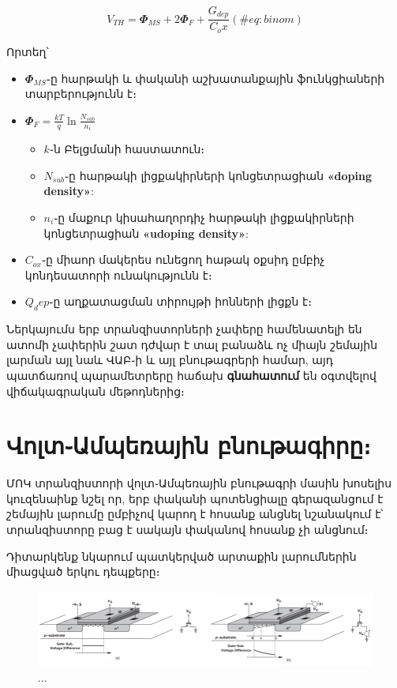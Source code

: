\documentclass[
]{book}
\providecommand{\tightlist}{%
  \setlength{\itemsep}{0pt}\setlength{\parskip}{0pt}}
\begin{document}
\begin{equation} 
  V_{TH} = 𝜱_{MS} + 2 𝜱_F + \frac{G_{dep}}{C_ox}
  (\#eq:binom)
\end{equation}

Որտեղ՝

\begin{itemize}
\tightlist
\item
  \(𝜱_{MS}\)֊ը հարթակի և փականի աշխատանքային ֆունկցիաների տարբերությունն
  է։
\item
  \(𝜱_F = \frac{kT}{q} \ln{\frac{N_{sub}}{n_i}}\)

  \begin{itemize}
  \tightlist
  \item
    \(k\)֊ն Բելցմանի հաստատուն։
  \item
    \(N_{sub}\)֊ը հարթակի լիցքակիրների կոնցետրացիան \textbf{«doping
    density»}:
  \item
    \(n_i\)֊ը մաքուր կիսահաղորդիչ հարթակի լիցքակիրների կոնցետրացիան
    \textbf{«udoping density»}:
  \end{itemize}
\item
  \(C_{ox}\)֊ը միաոր մակերես ունեցող հաթակ օքսիդ ըմբիչ կոնդեսատորի
  ունակությունն է։
\item
  \(Q_dep\)֊ը աղքատացման տիրույթի իոնների լիցքն է։
\end{itemize}

Ներկայումս երբ տրանզիստորների չափերը համենատելի են ատոմի չափերին շատ
դժվար է տալ բանաձև ոչ միայն շեմային լարման այլ նաև ՎԱԲ֊ի և այլ
բնութագրերի համար, այդ պատճառով պարամետրերը հաճախ \textbf{գնահատում} են
օգտվելով վիճակագրական մեթոդներից։

\hypertarget{ux57eux578ux56cux57fux561ux574ux57aux565ux57cux561ux575ux56bux576-ux562ux576ux578ux582ux569ux561ux563ux56bux580ux568}{%
\section{Վոլտ֊Ամպեռային
բնութագիրը։}\label{ux57eux578ux56cux57fux561ux574ux57aux565ux57cux561ux575ux56bux576-ux562ux576ux578ux582ux569ux561ux563ux56bux580ux568}}

ՄՈԿ տրանզիստորի վոլտ֊Ամպեռային բնութագրի մասին խոսելիս կուզենաինք նշել
որ, երբ փականի պոտենցիալը գերազանցում է շեմային լարումը ըմբիչով կարող է
հոսանք անցնել նշանակում է՝ տրանզիստորը բաց է սակայն փականով հոսանք չի
անցնում։

Դիտարկենք նկարում պատկերված արտաքին լարումներին միացված երկու դեպքերը։

\begin{figure}

{\centering \includegraphics[width=1\linewidth]{imige/va} 

}

\caption{...}\label{fig:unnamed-chunk-3}
\end{figure}
\end{document}
